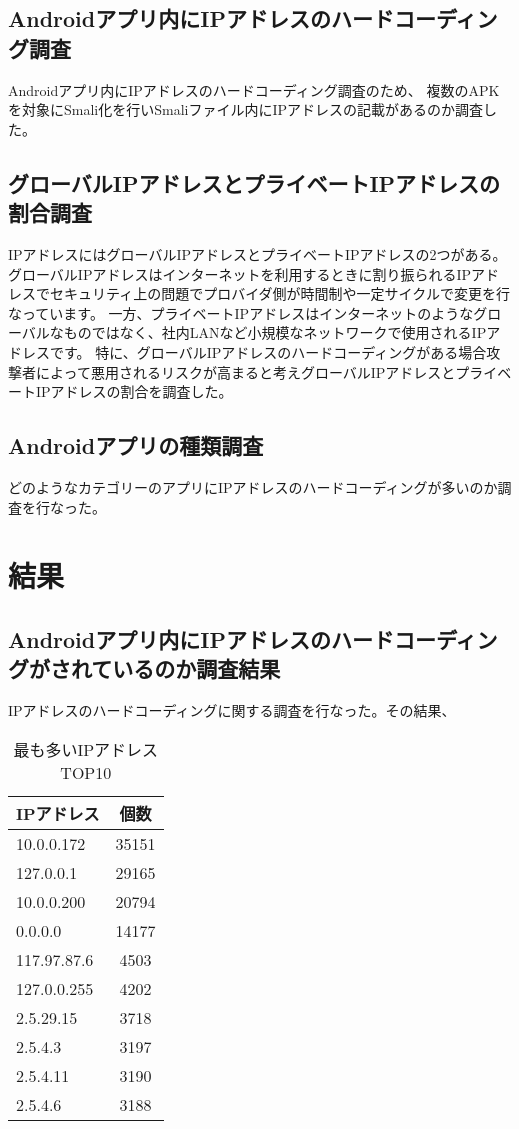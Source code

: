 \documentclass[a4j]{jarticle}
\begin{document}
\subsection{Androidアプリ内にIPアドレスのハードコーディング調査}
Androidアプリ内にIPアドレスのハードコーディング調査のため、
複数のAPKを対象にSmali化を行いSmaliファイル内にIPアドレスの記載があるのか調査した。
\subsection{グローバルIPアドレスとプライベートIPアドレスの割合調査}
IPアドレスにはグローバルIPアドレスとプライベートIPアドレスの2つがある。
グローバルIPアドレスはインターネットを利用するときに割り振られるIPアドレスでセキュリティ上の問題でプロバイダ側が時間制や一定サイクルで変更を行なっています。
一方、プライベートIPアドレスはインターネットのようなグローバルなものではなく、社内LANなど小規模なネットワークで使用されるIPアドレスです。
特に、グローバルIPアドレスのハードコーディングがある場合攻撃者によって悪用されるリスクが高まると考えグローバルIPアドレスとプライベートIPアドレスの割合を調査した。
\subsection{Androidアプリの種類調査}
どのようなカテゴリーのアプリにIPアドレスのハードコーディングが多いのか調査を行なった。
\newpage
\section{結果}
\subsection{Androidアプリ内にIPアドレスのハードコーディングがされているのか調査結果}

IPアドレスのハードコーディングに関する調査を行なった。その結果、

\begin{table}[htb]
  \begin{center}
    \caption{最も多いIPアドレスTOP10}
    \begin{tabular}{|l|c|} \hline
      IPアドレス & 個数  \\ \hline \hline
10.0.0.172 & 35151 \\ \hline
127.0.0.1 & 29165 \\ \hline
10.0.0.200 & 20794 \\ \hline
0.0.0.0 & 14177 \\ \hline
117.97.87.6 & 4503 \\ \hline
127.0.0.255 & 4202 \\ \hline
2.5.29.15 & 3718 \\ \hline
2.5.4.3 & 3197 \\ \hline
2.5.4.11 & 3190 \\ \hline
2.5.4.6 & 3188 \\ \hline
    \end{tabular}
    \label{tab:price}
  \end{center}
\end{table}
\end{document}
